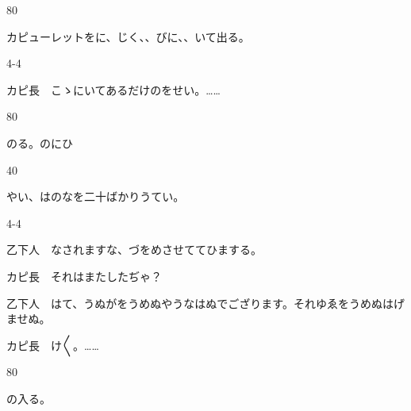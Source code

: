 \documentclass[tate,paper=b6j,jafontsize=9pt]{jlreq}
\begin{document}
\begin{azconvIndented}{8\zw}{0\zw}

カピューレットをに、じく、、びに、、いて出る。

\end{azconvIndented}
\begin{azconvIndented}{4\zw}{-4\zw}

カピ長　こゝにいてあるだけのをせい。……

\end{azconvIndented}
\begin{azconvIndented}{8\zw}{0\zw}

のる。のにひ

\end{azconvIndented}
\begin{azconvIndented}{4\zw}{0\zw}

やい、はのなを二十ばかりうてい。

\end{azconvIndented}
\begin{azconvIndented}{4\zw}{-4\zw}

乙下人　なされますな、づをめさせててひまする。

カピ長　それはまたしたぢゃ？

乙下人　はて、うぬがをうめぬやうなはぬでござります。それゆゑをうめぬはげませぬ。

カピ長　け{〳〵}。……

\end{azconvIndented}
\begin{azconvIndented}{8\zw}{0\zw}

の入る。

\end{azconvIndented}
\end{document}
